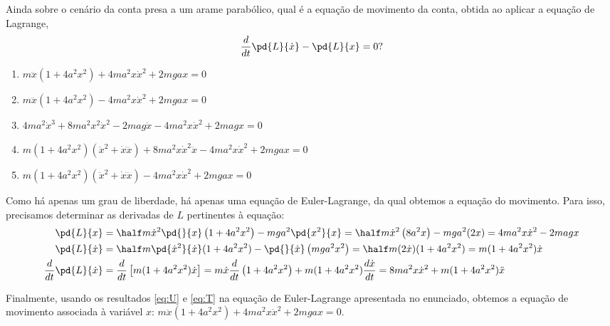 \begin{question}\label{q:eq-movimento}
    Ainda sobre o cenário da conta presa a um arame parabólico, qual é a equação de movimento da conta, obtida ao aplicar a equação de Lagrange,
    \begin{equation*}
      \frac{d}{dt}\pd{L}{\dot x} - \pd{L}{x} = 0?
    \end{equation*}

    \begin{enumerate}
      \item $m\ddot x(1 + 4a^2x^2) + 4ma^2 x \dot x^2 + 2mgax = 0$ \rightanswer
      \item $m\ddot x(1 + 4a^2x^2) - 4ma^2 x \dot x^2 + 2mgax = 0$
      \item $4ma^2\dot x^3 + 8ma^2x^2\dot x^2 - 2mag\dot x - 4ma^2x\dot x^2 + 2magx = 0$
      \item $m(1+4a^2x^2)(\ddot x^2 + \dot x\dddot x) + 8ma^2x\dot x^2 \ddot x - 4ma^2 x \dot x^2 + 2mgax = 0 $
      \item $m(1+4a^2x^2)(\ddot x^2 + \dot x\dddot x) - 4ma^2 x \dot x^2 + 2mgax = 0 $
    \end{enumerate}

    \begin{solution}
      Como há apenas um grau de liberdade, há apenas uma equação de Euler-Lagrange, da qual obtemos a equação do movimento.
      Para isso, precisamos determinar as derivadas de $L$ pertinentes à equação:
      \begin{align}
        \pd{L}{x} &= \half m \dot x^2 \pd{}{x}\left(1 + 4a^2 x^2\right) - mga^2\pd{x^2}{x} = 
          \half m \dot x^2 \left(8a^2 x\right) - mga^2(2x) = 4ma^2x\dot x^2 - 2magx \label{eq:U}\\
        \pd{L}{\dot x} &= \half m \pd{\dot x^2}{\dot x} (1 + 4a^2 x^2) - \pd{}{\dot x}\left(mga^2x^2\right) = 
          \half m (2\dot x) (1 + 4a^2 x^2) = m (1 + 4a^2 x^2) \dot x \nonumber\\
        \frac{d}{dt}\pd{L}{\dot x} &= \frac{d}{dt}\left[m (1 + 4a^2 x^2) \dot x\right] =
          m \dot x \frac{d}{dt}\left(1 + 4a^2 x^2\right) + m (1 + 4a^2 x^2) \frac{d\dot x}{dt}
            = 8ma^2x\dot x^2 + m (1 + 4a^2x^2)\ddot x \label{eq:T}
      \end{align}

      Finalmente, usando os resultados \eqref{eq:U} e \eqref{eq:T} na equação de Euler-Lagrange apresentada no enunciado, obtemos a equação de movimento associada à variável $x$: $m\ddot x(1 + 4a^2x^2) + 4ma^2 x \dot x^2 + 2mgax = 0$.
    \end{solution}
\end{question}
